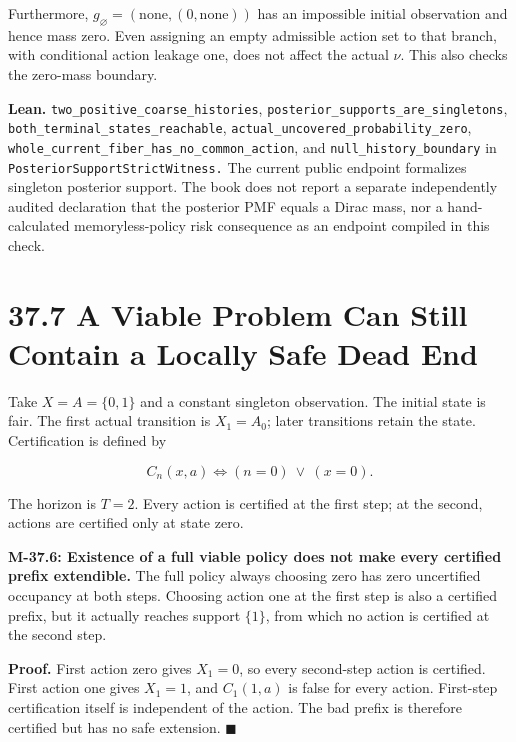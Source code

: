 \documentclass[
  english,
  11pt,
  oneside]{book}
\newcounter{none} %
\begin{document}
Furthermore, \(g_\varnothing=(\mathrm{none},(0,\mathrm{none}))\) has an impossible initial observation and hence mass zero. Even assigning an empty admissible action set to that branch, with conditional action leakage one, does not affect the actual \(\nu\). This also checks the zero-mass boundary.

\textbf{Lean.} \nolinkurl{two_positive_coarse_histories}, \nolinkurl{posterior_supports_are_singletons}, \nolinkurl{both_terminal_states_reachable}, \nolinkurl{actual_uncovered_probability_zero}, \nolinkurl{whole_current_fiber_has_no_common_action}, and \nolinkurl{null_history_boundary} in \nolinkurl{PosteriorSupportStrictWitness.} The current public endpoint formalizes singleton posterior support. The book does not report a separate independently audited declaration that the posterior PMF equals a Dirac mass, nor a hand-calculated memoryless-policy risk consequence as an endpoint compiled in this check.

\section{37.7 A Viable Problem Can Still Contain a Locally Safe Dead End}\label{a-viable-problem-can-still-contain-a-locally-safe-dead-end}

Take \(X=A=\{0,1\}\) and a constant singleton observation. The initial state is fair. The first actual transition is \(X_1=A_0\); later transitions retain the state. Certification is defined by

\[C_n(x,a)\iff(n=0)\ \lor\ (x=0).\]

The horizon is \(T=2\). Every action is certified at the first step; at the second, actions are certified only at state zero.

\hypertarget{m-37-6}{}\label{m-37-6}

\textbf{M-37.6: Existence of a full viable policy does not make every certified prefix extendible.} The full policy always choosing zero has zero uncertified occupancy at both steps. Choosing action one at the first step is also a certified prefix, but it actually reaches support \(\{1\}\), from which no action is certified at the second step.

\textbf{Proof.} First action zero gives \(X_1=0\), so every second-step action is certified. First action one gives \(X_1=1\), and \(C_1(1,a)\) is false for every action. First-step certification itself is independent of the action. The bad prefix is therefore certified but has no safe extension. \(\blacksquare\)
\end{document}
